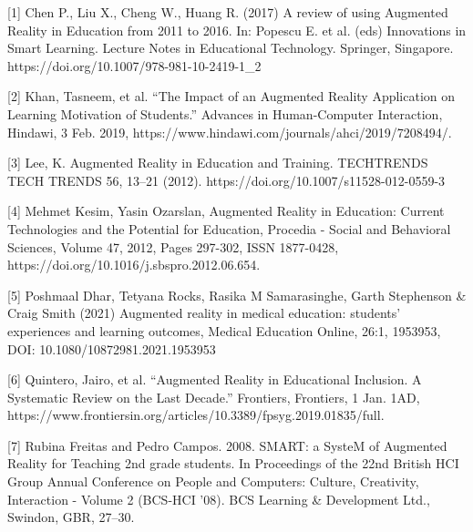 \documentclass{vgtc}                          %
\begin{document}


%

%
%
%



[1] Chen P., Liu X., Cheng W., Huang R. (2017) A review of using Augmented Reality in Education from 2011 to 2016. In: Popescu E. et al. (eds) Innovations in Smart Learning. Lecture Notes in Educational Technology. Springer, Singapore. https://doi.org/10.1007/978-981-10-2419-1\_2
\vspace*{4mm}

[2] Khan, Tasneem, et al. “The Impact of an Augmented Reality Application on Learning Motivation of Students.” Advances in Human-Computer Interaction, Hindawi, 3 Feb. 2019, https://www.hindawi.com/journals/ahci/2019/7208494/.
\vspace*{4mm}

[3] Lee, K. Augmented Reality in Education and Training. TECHTRENDS TECH TRENDS 56, 13–21 (2012). https://doi.org/10.1007/s11528-012-0559-3
\vspace*{4mm}

[4] Mehmet Kesim, Yasin Ozarslan, Augmented Reality in Education: Current Technologies and the Potential for Education, Procedia - Social and Behavioral Sciences, Volume 47, 2012, Pages 297-302, ISSN 1877-0428, https://doi.org/10.1016/j.sbspro.2012.06.654.
\vspace*{4mm}

[5] Poshmaal Dhar, Tetyana Rocks, Rasika M Samarasinghe, Garth Stephenson & Craig Smith (2021) Augmented reality in medical education: students’ experiences and learning outcomes, Medical Education Online, 26:1, 1953953, DOI: 10.1080/10872981.2021.1953953
\vspace*{4mm}

[6] Quintero, Jairo, et al. “Augmented Reality in Educational Inclusion. A Systematic Review on the Last Decade.” Frontiers, Frontiers, 1 Jan. 1AD, https://www.frontiersin.org/articles/10.3389/fpsyg.2019.01835/full.
\vspace*{4mm}

[7] Rubina Freitas and Pedro Campos. 2008. SMART: a SysteM of Augmented Reality for Teaching 2nd grade students. In Proceedings of the 22nd British HCI Group Annual Conference on People and Computers: Culture, Creativity, Interaction - Volume 2 (BCS-HCI '08). BCS Learning & Development Ltd., Swindon, GBR, 27–30.
\vspace*{4mm}
\end{document}
